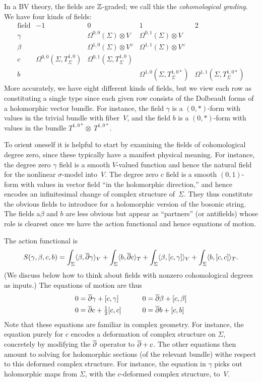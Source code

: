 In a BV theory, the fields are $\mathbb Z$-graded;
we call this the {\em cohomological grading}.
We have four kinds of fields:
\[
\begin{array}{ccccc}
\text{field} & -1 & 0 & 1 & 2\\
\hline
\gamma & & \Omega^{0,0}(\Sigma) \otimes V & \Omega^{0,1}(\Sigma) \otimes V & \\
\beta & & \Omega^{1,0}(\Sigma) \otimes V^\vee & \Omega^{1,1}(\Sigma) \otimes V^\vee & \\
c & \Omega^{0,0}(\Sigma, T^{1,0}_\Sigma) & \Omega^{0,1}(\Sigma, T^{1,0}_\Sigma) & \\
b & & & \Omega^{1,0}(\Sigma, T^{1,0 *}_\Sigma) & \Omega^{1,1}(\Sigma, T^{1,0 *}_\Sigma)
\end{array}
\]
More accurately, we have eight different kinds of fields, 
but we view each row as constituting a single type 
since each given row consists of the Dolbeault forms of a holomorphic vector bundle.
For instance, the field $\gamma$ is a $(0,*)$-form with values in the trivial bundle with fiber~$V$,
and the field $b$ is a $(0,*)$-form with values in the bundle $T^{1,0 *} \otimes~T^{1,0 *}$.

To orient oneself it is helpful to start by examining the fields of cohomological degree zero,
since these typically have a manifest physical meaning.
For instance, the degree zero $\gamma$ field is a smooth $V$-valued function
and hence the natural field for the nonlinear $\sigma$-model into~$V$.
The degree zero $c$ field is a smooth $(0,1)$-form with values in vector field ``in the holomorphic direction,''
and hence encodes an infinitesimal change of complex structure of~$\Sigma$.
They thus constitute the obvious fields to introduce for a holomorphic version of the bosonic string.
The fields a$\beta$ and $b$ are less obvious but appear as ``partners'' (or antifields)
whose role is clearest once we have the action functional and hence equations of motion.

The action functional is
\begin{equation}
S(\gamma,\beta,c,b) = 
\int_\Sigma \langle \beta, \overline{\partial} \gamma \rangle_V 
+ \int_\Sigma \langle b, \overline{\partial} c \rangle_T 
+ \int_\Sigma \langle \beta, [c,\gamma] \rangle_V 
+ \int_\Sigma \langle b, [c,c] \rangle_T.
\end{equation}
(We discuss below how to think about fields with nonzero cohomological degrees as inputs.)
The equations of motion are thus
\begin{alignat*}{2}
0 &= \overline{\partial} \gamma + [c,\gamma] & \quad\quad  0 &= \overline{\partial} \beta + [c,\beta] \\
0  &= \overline{\partial} c + \tfrac{1}{2} [c,c] & \quad\quad  0 &= \overline{\partial} b + [c,b] 
\end{alignat*}
Note that these equations are familiar in complex geometry.
For instance, the equation purely for $c$ encodes a deformation of complex structure on $\Sigma$, concretely by modifying the $\overline{\partial}$ operator to $\overline{\partial} + c$.
The other equations then amount to solving for holomorphic sections (of the relevant bundle) withe respect to this deformed complex structure.
For instance, the equation in $\gamma$ picks out holomorphic maps from $\Sigma$,
with the $c$-deformed complex structure, to~$V$.

